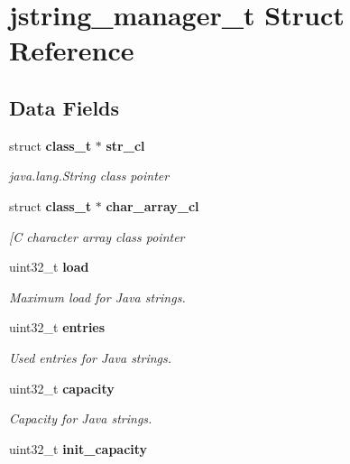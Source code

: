 \section{jstring\_\-manager\_\-t Struct Reference}
\label{structjstring__manager__t}
\subsection*{Data Fields}
\begin{DoxyCompactItemize}
\item 
struct {\bf class\_\-t} $\ast$ {\bf str\_\-cl}\label{structjstring__manager__t_a0c39c1bf24719acb564e79fb0a7f0cbf}

\begin{DoxyCompactList}\small\item\em java.lang.String class pointer \item\end{DoxyCompactList}\item 
struct {\bf class\_\-t} $\ast$ {\bf char\_\-array\_\-cl}\label{structjstring__manager__t_aa9f48f5dd54ce75c97f4a8829d37c806}

\begin{DoxyCompactList}\small\item\em [C character array class pointer \item\end{DoxyCompactList}\item 
uint32\_\-t {\bf load}\label{structjstring__manager__t_a6fe610f3e5a2db4bb08af28198521961}

\begin{DoxyCompactList}\small\item\em Maximum load for Java strings. \item\end{DoxyCompactList}\item 
uint32\_\-t {\bf entries}\label{structjstring__manager__t_a9257855ca29da2035f83e8741585d49a}

\begin{DoxyCompactList}\small\item\em Used entries for Java strings. \item\end{DoxyCompactList}\item 
uint32\_\-t {\bf capacity}\label{structjstring__manager__t_a396289b596dcde9f9b247e8e5e699627}

\begin{DoxyCompactList}\small\item\em Capacity for Java strings. \item\end{DoxyCompactList}\item 
uint32\_\-t {\bf init\_\-capacity}\label{structjstring__manager__t_a4bb16cca69d8f37032d3f03d83a285f2}


\end{DoxyCompactItemize}
